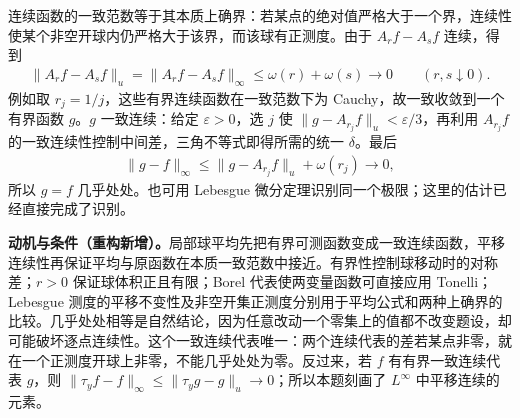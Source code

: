 \documentclass[../../main.tex]{subfiles}
\begin{document}
\begin{solution}
连续函数的一致范数等于其本质上确界：若某点的绝对值严格大于一个界，连续性使某个非空开球内仍严格大于该界，而该球有正测度。由于 $A_rf-A_sf$ 连续，得到
\begin{align*}
\|A_rf-A_sf\|_u=\|A_rf-A_sf\|_\infty
\leqslant\omega(r)+\omega(s)\longrightarrow0\qquad(r,s\downarrow0).
\end{align*}
例如取 $r_j=1/j$，这些有界连续函数在一致范数下为 Cauchy，故一致收敛到一个有界函数 $g$。$g$ 一致连续：给定 $\varepsilon>0$，选 $j$ 使 $\|g-A_{r_j}f\|_u<\varepsilon/3$，再利用 $A_{r_j}f$ 的一致连续性控制中间差，三角不等式即得所需的统一 $\delta$。最后
\begin{align*}
\|g-f\|_\infty\leqslant
\|g-A_{r_j}f\|_u+\omega(r_j)\longrightarrow0,
\end{align*}
所以 $g=f$ 几乎处处。也可用 Lebesgue 微分定理识别同一个极限；这里的估计已经直接完成了识别。
\end{solution}
\begin{remark}
\textbf{动机与条件（重构新增）。}局部球平均先把有界可测函数变成一致连续函数，平移连续性再保证平均与原函数在本质一致范数中接近。有界性控制球移动时的对称差；$r>0$ 保证球体积正且有限；Borel 代表使两变量函数可直接应用 Tonelli；Lebesgue 测度的平移不变性及非空开集正测度分别用于平均公式和两种上确界的比较。几乎处处相等是自然结论，因为任意改动一个零集上的值都不改变题设，却可能破坏逐点连续性。这个一致连续代表唯一：两个连续代表的差若某点非零，就在一个正测度开球上非零，不能几乎处处为零。反过来，若 $f$ 有有界一致连续代表 $g$，则 $\|\tau_yf-f\|_\infty\leqslant\|\tau_yg-g\|_u\to0$；所以本题刻画了 $L^\infty$ 中平移连续的元素。
\end{remark}
\end{document}
